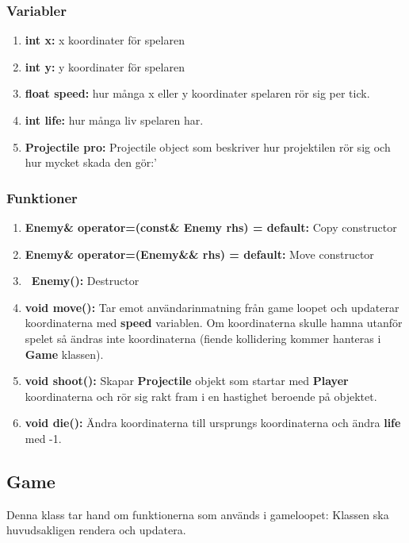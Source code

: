 \documentclass{TDP005mall}
\begin{document}
\subsubsection*{Variabler}
\begin{enumerate}
  \item \textbf{int x{}:} x koordinater för spelaren
  \item \textbf{int y{}:} y koordinater för spelaren
  \item \textbf{float speed{}:} hur många x eller y koordinater spelaren rör sig per tick.
  \item \textbf{int life{}:} hur många liv spelaren har.
  \item \textbf{Projectile pro{}:} Projectile object som beskriver hur projektilen rör sig och hur mycket skada den gör:'
\end{enumerate}
\subsubsection*{Funktioner}
\begin{enumerate}
  \item \textbf{Enemy\& operator=(const\& Enemy rhs) = default:} Copy constructor
  \item \textbf{Enemy\& operator=(Enemy\&\& rhs) = default:} Move constructor
  \item \textbf{~Enemy():} Destructor
  \item \textbf{void move():} Tar emot användarinmatning från game loopet och updaterar koordinaterna med \textbf{speed} variablen.
    Om koordinaterna skulle hamna utanför spelet så ändras inte koordinaterna (fiende kollidering kommer hanteras i \textbf{Game} klassen). 
  \item \textbf{void shoot():} Skapar \textbf{Projectile} objekt som startar med \textbf{Player} koordinaterna och rör sig rakt fram i en hastighet beroende på objektet. 
  \item \textbf{void die():} Ändra koordinaterna till ursprungs koordinaterna och ändra \textbf{life} med -1.
  
\end{enumerate}
\subsection{Game}
Denna klass tar hand om funktionerna som används i gameloopet:
Klassen ska huvudsakligen rendera och updatera.
\end{document}
